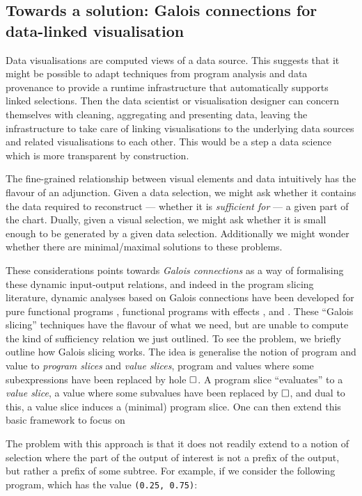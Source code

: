 

\subsection{Towards a solution: Galois connections for data-linked visualisation}

Data visualisations are computed views of a data source. This suggests that it might be possible to adapt techniques from program analysis and data provenance to provide a runtime infrastructure that automatically supports linked selections. Then the data scientist or visualisation designer can concern themselves with cleaning, aggregating and presenting data, leaving the infrastructure to take care of linking visualisations to the underlying data sources and related visualisations to each other. This would be a step a data science which is more transparent by construction.

The fine-grained relationship between visual elements and data intuitively has the flavour of an adjunction. Given a data selection, we might ask whether it contains the data required to reconstruct --- whether it is \emph{sufficient for} --- a given part of the chart. Dually, given a visual selection, we might ask whether it is small enough to be generated by a given data selection. Additionally we might wonder whether there are minimal/maximal solutions to these problems.

These considerations points towards \emph{Galois connections} as a way of formalising these dynamic input-output relations, and indeed in the program slicing literature, dynamic analyses based on Galois connections have been developed for pure functional programs \cite{perera12a}, functional programs with effects \cite{ricciotti17}, and \piCalculus \cite{perera16d}. These ``Galois slicing'' techniques have the flavour of what we need, but are unable to compute the kind of sufficiency relation we just outlined. To see the problem, we briefly outline how Galois slicing works. The idea is generalise the notion of program and value to \emph{program slices} and \emph{value slices}, program and values where some subexpressions have been replaced by hole $\square$. A program slice ``evaluates'' to a \emph{value slice}, a value where some subvalues have been replaced by $\square$, and dual to this, a value slice induces a (minimal) program slice. One can then extend this basic framework to focus on

The problem with this approach is that it does not readily extend to a notion of selection where the part of the output of interest is not a prefix of the output, but rather a prefix of some subtree. For example, if we consider the following program, which has the value \lstinline{(0.25, 0.75)}:

